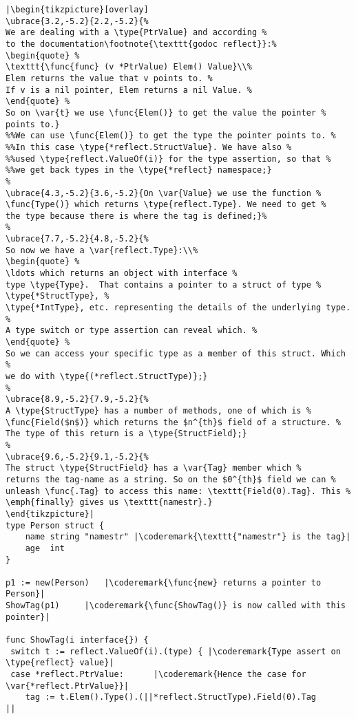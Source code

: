 \begin{lstlisting}[caption=Introspection using reflection,label=src:introspection]
|\begin{tikzpicture}[overlay]
\ubrace{3.2,-5.2}{2.2,-5.2}{%
We are dealing with a \type{PtrValue} and according %
to the documentation\footnote{\texttt{godoc reflect}}:%
\begin{quote} %
\texttt{\func{func} (v *PtrValue) Elem() Value}\\%
Elem returns the value that v points to. %
If v is a nil pointer, Elem returns a nil Value. %
\end{quote} %
So on \var{t} we use \func{Elem()} to get the value the pointer %
points to.}
%%We can use \func{Elem()} to get the type the pointer points to. %
%%In this case \type{*reflect.StructValue}. We have also %
%%used \type{reflect.ValueOf(i)} for the type assertion, so that %
%%we get back types in the \type{*reflect} namespace;}
%
\ubrace{4.3,-5.2}{3.6,-5.2}{On \var{Value} we use the function %
\func{Type()} which returns \type{reflect.Type}. We need to get %
the type because there is where the tag is defined;}%
%
\ubrace{7.7,-5.2}{4.8,-5.2}{%
So now we have a \var{reflect.Type}:\\%
\begin{quote} %
\ldots which returns an object with interface %
type \type{Type}.  That contains a pointer to a struct of type %
\type{*StructType}, %
\type{*IntType}, etc. representing the details of the underlying type. %
A type switch or type assertion can reveal which. %
\end{quote} %
So we can access your specific type as a member of this struct. Which %
we do with \type{(*reflect.StructType)};}
%
\ubrace{8.9,-5.2}{7.9,-5.2}{%
A \type{StructType} has a number of methods, one of which is %
\func{Field($n$)} which returns the $n^{th}$ field of a structure. %
The type of this return is a \type{StructField};}
%
\ubrace{9.6,-5.2}{9.1,-5.2}{%
The struct \type{StructField} has a \var{Tag} member which %
returns the tag-name as a string. So on the $0^{th}$ field we can %
unleash \func{.Tag} to access this name: \texttt{Field(0).Tag}. This %
\emph{finally} gives us \texttt{namestr}.}
\end{tikzpicture}|
type Person struct {
    name string "namestr" |\coderemark{\texttt{"namestr"} is the tag}|
    age  int
}

p1 := new(Person)   |\coderemark{\func{new} returns a pointer to Person}|
ShowTag(p1)	    |\coderemark{\func{ShowTag()} is now called with this pointer}|

func ShowTag(i interface{}) {
 switch t := reflect.ValueOf(i).(type) { |\coderemark{Type assert on \type{reflect} value}|
 case *reflect.PtrValue:	  |\coderemark{Hence the case for \var{*reflect.PtrValue}}|
	tag := t.Elem().Type().(||*reflect.StructType).Field(0).Tag
||
\end{lstlisting}
